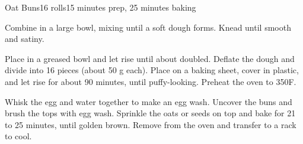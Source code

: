 \documentclass[../Cookbook.tex]{subfiles}
\begin{document}
\begin{recipe}[OatBuns]{Oat Buns}{16 rolls}{15 minutes prep, 25 minutes baking}
\renewcommand*{\thefootnote}{\num{footnote}}

Combine in a large bowl, mixing until a soft dough forms.
Knead until smooth and satiny.

Place in a greased bowl and let rise until about doubled.
Deflate the dough and divide into 16 pieces (about 50 g each).
Place on a baking sheet, cover in plastic, and let rise for about 90 minutes, until puffy-looking.
Preheat the oven to 350\0F.

Whisk the egg and water together to make an egg wash.
Uncover the buns and brush the tops with egg wash.
Sprinkle the oats or seeds on top and bake for 21 to 25 minutes, until golden brown.
Remove from the oven and transfer to a rack to cool.
\end{recipe}
\end{document}
